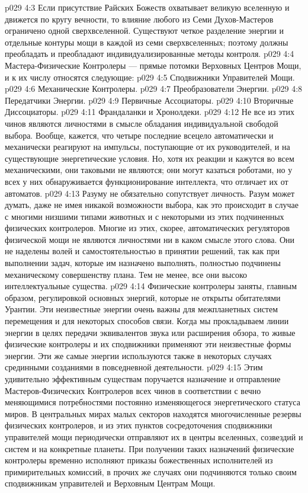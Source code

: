 \vs p029 4:3 Если присутствие Райских Божеств охватывает великую вселенную и движется по кругу вечности, то влияние любого из Семи Духов\hyp{}Мастеров ограничено одной сверхвселенной. Существуют четкое разделение энергии и отдельные контуры мощи в каждой из семи сверхвселенных; поэтому должны преобладать и преобладают индивидуализированные методы контроля.
\vs p029 4:4 \pc Мастера\hyp{}Физические Контролеры --- прямые потомки Верховных Центров Мощи, и к их числу относятся следующие:
\vs p029 4:5 \bibnobreakspace Сподвижники Управителей Мощи.
\vs p029 4:6 \bibnobreakspace Механические Контролеры.
\vs p029 4:7 \bibnobreakspace Преобразователи Энергии.
\vs p029 4:8 \bibnobreakspace Передатчики Энергии.
\vs p029 4:9 \bibnobreakspace Первичные Ассоциаторы.
\vs p029 4:10 \bibnobreakspace Вторичные Диссоциаторы.
\vs p029 4:11 \bibnobreakspace Франдаланки и Хронолдеки.
\vs p029 4:12 \pc Не все из этих чинов являются личностями в смысле обладания индивидуальной свободой выбора. Вообще, кажется, что четыре последние всецело автоматически и механически реагируют на импульсы, поступающие от их руководителей, и на существующие энергетические условия. Но, хотя их реакции и кажутся во всем механическими, они таковыми не являются; они могут казаться роботами, но у всех у них обнаруживается функционирование интеллекта, что отличает их от автоматов.
\vs p029 4:13 Разуму не обязательно сопутствует личность. Разум может думать, даже не имея никакой возможности выбора, как это происходит в случае с многими низшими типами животных и с некоторыми из этих подчиненных физических контролеров. Многие из этих, скорее, автоматических регуляторов физической мощи не являются личностями ни в каком смысле этого слова. Они не наделены волей и самостоятельностью в принятии решений, так как при выполнении задач, которые им назначено выполнять, полностью подчинены механическому совершенству плана. Тем не менее, все они высоко интеллектуальные существа.
\vs p029 4:14 Физические контролеры заняты, главным образом, регулировкой основных энергий, которые не открыты обитателями Урантии. Эти неизвестные энергии очень важны для межпланетных систем перемещения и для некоторых способов связи. Когда мы прокладываем линии энергии в целях передачи эквивалентов звука или расширения обзора, то живые физические контролеры и их сподвижники применяют эти неизвестные формы энергии. Эти же самые энергии используются также в некоторых случаях срединными созданиями в повседневной деятельности.
\vs p029 4:15 \pc {}\bibnobreakspace {} Этим удивительно эффективным существам поручается назначение и отправление Мастеров\hyp{}Физических Контролеров всех чинов в соответствии с вечно меняющимися потребностями постоянно изменяющегося энергетического статуса миров. В центральных мирах малых секторов находятся многочисленные резервы физических контролеров, и из этих пунктов сосредоточения сподвижники управителей мощи периодически отправляют их в центры вселенных, созвездий и систем и на конкретные планеты. При получении таких назначений физические контролеры временно исполняют приказы божественных исполнителей из примирительных комиссий, в прочих же случаях они подчиняются только своим сподвижникам управителей и Верховным Центрам Мощи.
